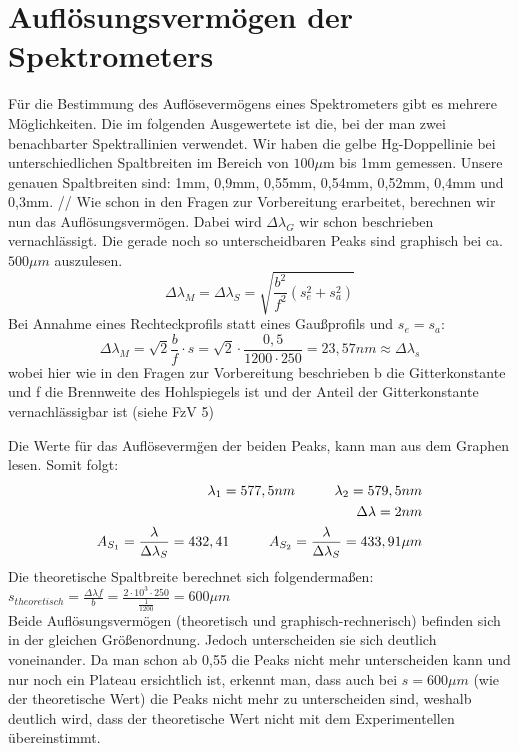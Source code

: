 \section{Auflösungsvermögen der Spektrometers}
F\"ur die Bestimmung des Aufl\"oseverm\"ogens eines Spektrometers gibt es mehrere M\"oglichkeiten. Die im folgenden Ausgewertete ist die, bei der man zwei benachbarter 
Spektrallinien verwendet. Wir haben die gelbe Hg-Doppellinie bei unterschiedlichen Spaltbreiten im Bereich von $100\mu$m bis 1mm gemessen. 
Unsere genauen Spaltbreiten sind: 1mm, 0,9mm, 0,55mm, 0,54mm, 0,52mm, 0,4mm und 0,3mm. //
Wie schon in den Fragen zur Vorbereitung erarbeitet, berechnen wir nun das Aufl\"osungsverm\"ogen. Dabei wird $\Delta\lambda_G$ wir schon beschrieben vernachl\"assigt. 
Die gerade noch so unterscheidbaren Peaks sind graphisch bei ca. $500\mu m$ auszulesen.   \\
\begin{equation}
\Delta\lambda_M=\Delta\lambda_S=\sqrt{\frac{b^2}{f^2}(s_e^2+s_a^2)}
\end{equation}
Bei Annahme eines Rechteckprofils statt eines Gaußprofils und $s_e=s_a$:
\begin{equation}
\Delta\lambda_M=\sqrt{2}\frac{b}{f}\cdot s = \sqrt{2}\cdot \frac{0,5}{1200\cdot 250} =23,57nm \approx \Delta\lambda_s
\end{equation}
wobei hier wie in den Fragen zur Vorbereitung beschrieben b die Gitterkonstante und f die Brennweite des Hohlspiegels ist und der Anteil der Gitterkonstante 
vernachl\"assigbar ist (siehe FzV 5)

Die Werte f\"ur das Aufl\"oseverm\"gen der beiden Peaks, kann man aus dem Graphen lesen. Somit folgt:\\
\begin{align}
\lambda_1=577,5nm \hspace*{1cm} \lambda_2=579,5nm\\
\Delta\lambda=2nm\\
A_{S_1}=\frac{\lambda}{\Delta\lambda_S}=432,41 \hspace*{1cm} A_{S_2}=\frac{\lambda}{\Delta\lambda_S}=433,91\mu m
\end{align}
Die theoretische Spaltbreite berechnet sich folgenderma\ss{}en:\\
$s_{theoretisch} = \frac{\Delta\lambda f}{b}=\frac{2 \cdot 10^3 \cdot 250}{\frac{1}{1200}}= 600\mu m$\\
Beide Aufl\"osungsverm\"ogen (theoretisch und graphisch-rechnerisch) befinden sich in der gleichen Gr\"o\ss{}enordnung. Jedoch unterscheiden sie sich deutlich 
voneinander. Da man schon ab 0,55 die Peaks nicht mehr unterscheiden kann und nur noch ein Plateau ersichtlich ist, erkennt man, dass auch bei $s=600\mu m$ (wie der 
theoretische Wert) die Peaks nicht mehr zu unterscheiden sind, weshalb deutlich wird, dass der theoretische Wert nicht mit dem Experimentellen \"ubereinstimmt.
